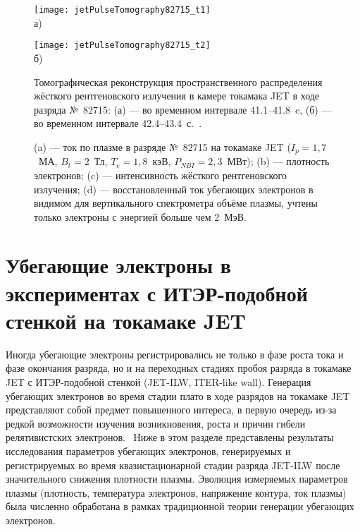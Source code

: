 \begin{figure}[ht]
    \begin{minipage}[b][][b]{0.48\linewidth}\centering
        \texttt{[image: jetPulseTomography82715\_t1]} \\ а)
    \end{minipage}
    \hfill
    \begin{minipage}[b][][b]{0.48\linewidth}\centering
        \texttt{[image: jetPulseTomography82715\_t2]} \\ б)
    \end{minipage}
    \caption{ Томографическая реконструкция пространственного распределения жёсткого рентгеновского излучения в камере токамака JET в ходе разряда №~82715: (а) --- во временном интервале 41.1--41.8~c, (б) --- во временном интервале 42.4--43.4~с.~\cite{Shevelev2013a}. }
    \label{fig:jetPulseTomography82715}
\end{figure}

\begin{figure}[ht!]
  \caption{ (a) --- ток по плазме в разряде №~82715 на токамаке JET ($I_p = 1,7$~МА, $B_t = 2$~Тл, $T_e = 1,8$~кэВ, $P_{NBI} = 2,3$~МВт); (b) ---  плотность электронов; (c) ---  интенсивность жёсткого рентгеновского излучения; (d) --- восстановленный ток убегающих электронов в видимом для вертикального спектрометра объёме плазмы, учтены только электроны с энергией больше чем 2~МэВ.~\cite{Shevelev2013} }
  \label{fig:jetPulseParams82715}
\end{figure}



\FloatBarrier
\section{Убегающие электроны в экспериментах с ИТЭР-подобной стенкой на токамаке JET}

Иногда убегающие электроны регистрировались не только в фазе роста тока и фазе окончания разряда, но и на переходных стадиях пробоя разряда в токамаке JET с ИТЭР-подобной стенкой (JET-ILW, ITER-like wall). Генерация убегающих электронов во время стадии плато в ходе разрядов на токамаке JET представляют собой предмет повышенного интереса, в первую очередь из-за редкой возможности изучения возникновения, роста и причин гибели релятивистских электронов.~\cite{Granetz2014} Ниже в этом разделе представлены результаты исследования параметров убегающих электронов, генерируемых и регистрируемых во время квазистационарной стадии разряда JET-ILW после значительного снижения плотности плазмы. Эволюция измеряемых параметров плазмы (плотность, температура электронов, напряжение контура, ток плазмы) была численно обработана в рамках традиционной теории генерации убегающих электронов.~\cite{Plyusnin2015}

